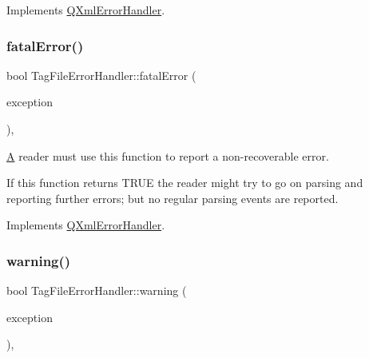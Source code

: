 Implements \mbox{\hyperlink{class_q_xml_error_handler_a7b265803d41782e6207b497fe09beff0}{Q\+Xml\+Error\+Handler}}.

\mbox{\label{class_tag_file_error_handler_a7562a9fb258c3d4005ea4a3327623e60}} 
\subsubsection{\texorpdfstring{fatalError()}{fatalError()}}
{\footnotesize\ttfamily bool Tag\+File\+Error\+Handler\+::fatal\+Error (\begin{DoxyParamCaption}\item[{const \mbox{\hyperlink{class_q_xml_parse_exception}{Q\+Xml\+Parse\+Exception}} \&}]{exception }\end{DoxyParamCaption})\hspace{0.3cm}{\ttfamily [inline]}, {\ttfamily [virtual]}}

\mbox{\hyperlink{class_a}{A}} reader must use this function to report a non-\/recoverable error.

If this function returns T\+R\+UE the reader might try to go on parsing and reporting further errors; but no regular parsing events are reported. 

Implements \mbox{\hyperlink{class_q_xml_error_handler_aaa8c1ad1b42a5257cf2344c7fe101797}{Q\+Xml\+Error\+Handler}}.

\mbox{\label{class_tag_file_error_handler_a5512c9023933b9a9a457f75f7654412a}} 
\subsubsection{\texorpdfstring{warning()}{warning()}}
{\footnotesize\ttfamily bool Tag\+File\+Error\+Handler\+::warning (\begin{DoxyParamCaption}\item[{const \mbox{\hyperlink{class_q_xml_parse_exception}{Q\+Xml\+Parse\+Exception}} \&}]{exception }\end{DoxyParamCaption})\hspace{0.3cm}{\ttfamily [inline]}, {\ttfamily [virtual]}}

